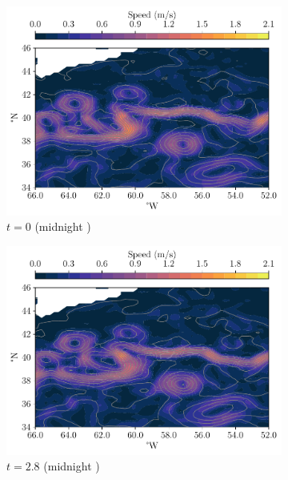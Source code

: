 \begin{figure}
	\begin{center}
		\begin{subfigure}{0.49\textwidth}
			\includegraphics[width=\textwidth]{chp06_applications/figures/gulf_stream/streamlines_0}
			\caption{\(t = 0\) (midnight )}
		\end{subfigure}
		\begin{subfigure}{0.49\textwidth}
			\includegraphics[width=\textwidth]{chp06_applications/figures/gulf_stream/streamlines_2}
			\caption{\(t = 2.8\) (midnight )}
		\end{subfigure}
		\begin{subfigure}{0.49\textwidth}

\end{subfigure}
\end{center}
\end{figure}

